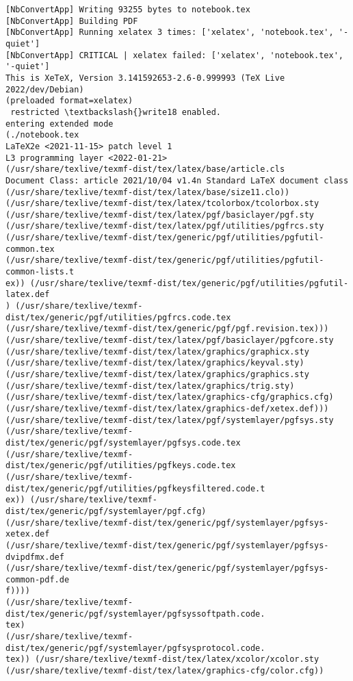 \documentclass[11pt]{article}
\begin{document}
\begin{Verbatim}[commandchars=\\\{\}]
[NbConvertApp] Writing 93255 bytes to notebook.tex
[NbConvertApp] Building PDF
[NbConvertApp] Running xelatex 3 times: ['xelatex', 'notebook.tex', '-quiet']
[NbConvertApp] CRITICAL | xelatex failed: ['xelatex', 'notebook.tex', '-quiet']
This is XeTeX, Version 3.141592653-2.6-0.999993 (TeX Live 2022/dev/Debian)
(preloaded format=xelatex)
 restricted \textbackslash{}write18 enabled.
entering extended mode
(./notebook.tex
LaTeX2e <2021-11-15> patch level 1
L3 programming layer <2022-01-21>
(/usr/share/texlive/texmf-dist/tex/latex/base/article.cls
Document Class: article 2021/10/04 v1.4n Standard LaTeX document class
(/usr/share/texlive/texmf-dist/tex/latex/base/size11.clo))
(/usr/share/texlive/texmf-dist/tex/latex/tcolorbox/tcolorbox.sty
(/usr/share/texlive/texmf-dist/tex/latex/pgf/basiclayer/pgf.sty
(/usr/share/texlive/texmf-dist/tex/latex/pgf/utilities/pgfrcs.sty
(/usr/share/texlive/texmf-dist/tex/generic/pgf/utilities/pgfutil-common.tex
(/usr/share/texlive/texmf-dist/tex/generic/pgf/utilities/pgfutil-common-lists.t
ex)) (/usr/share/texlive/texmf-dist/tex/generic/pgf/utilities/pgfutil-latex.def
) (/usr/share/texlive/texmf-dist/tex/generic/pgf/utilities/pgfrcs.code.tex
(/usr/share/texlive/texmf-dist/tex/generic/pgf/pgf.revision.tex)))
(/usr/share/texlive/texmf-dist/tex/latex/pgf/basiclayer/pgfcore.sty
(/usr/share/texlive/texmf-dist/tex/latex/graphics/graphicx.sty
(/usr/share/texlive/texmf-dist/tex/latex/graphics/keyval.sty)
(/usr/share/texlive/texmf-dist/tex/latex/graphics/graphics.sty
(/usr/share/texlive/texmf-dist/tex/latex/graphics/trig.sty)
(/usr/share/texlive/texmf-dist/tex/latex/graphics-cfg/graphics.cfg)
(/usr/share/texlive/texmf-dist/tex/latex/graphics-def/xetex.def)))
(/usr/share/texlive/texmf-dist/tex/latex/pgf/systemlayer/pgfsys.sty
(/usr/share/texlive/texmf-dist/tex/generic/pgf/systemlayer/pgfsys.code.tex
(/usr/share/texlive/texmf-dist/tex/generic/pgf/utilities/pgfkeys.code.tex
(/usr/share/texlive/texmf-dist/tex/generic/pgf/utilities/pgfkeysfiltered.code.t
ex)) (/usr/share/texlive/texmf-dist/tex/generic/pgf/systemlayer/pgf.cfg)
(/usr/share/texlive/texmf-dist/tex/generic/pgf/systemlayer/pgfsys-xetex.def
(/usr/share/texlive/texmf-dist/tex/generic/pgf/systemlayer/pgfsys-dvipdfmx.def
(/usr/share/texlive/texmf-dist/tex/generic/pgf/systemlayer/pgfsys-common-pdf.de
f))))
(/usr/share/texlive/texmf-dist/tex/generic/pgf/systemlayer/pgfsyssoftpath.code.
tex)
(/usr/share/texlive/texmf-dist/tex/generic/pgf/systemlayer/pgfsysprotocol.code.
tex)) (/usr/share/texlive/texmf-dist/tex/latex/xcolor/xcolor.sty
(/usr/share/texlive/texmf-dist/tex/latex/graphics-cfg/color.cfg))

\end{Verbatim}
\end{document}
